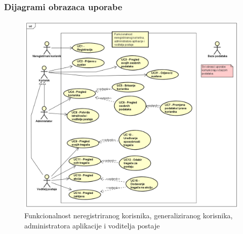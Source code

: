 					
					
				\subsubsection{Dijagrami obrazaca uporabe}
					
					\textit{}
				
					\begin{figure}[H]
						\includegraphics[scale=0.55]{slike/dijagram admin.png} %
						\centering
						\caption{Funkcionalnost neregistriranog korisnika, generaliziranog korisnika, administratora aplikacije i voditelja postaje}
						\label{fig:Funkcionalnost neregistriranog korisnika, administratora aplikacije i voditelja postaje}
					\end{figure}
					
